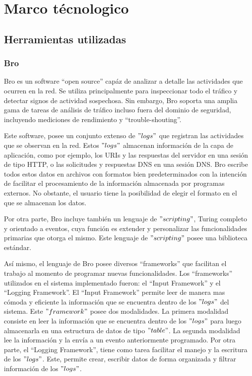 \chapter{Marco técnologico}
\label{capituloTecnologico}

\section{Herramientas utilizadas}

\subsection{Bro}

Bro es un software ``open source'' cap\'az de analizar a detalle las actividades que ocurren en la red. Se utiliza principalmente para inspeccionar todo el tráfico y detectar signos de actividad sospechosa. Sin embargo, Bro soporta una amplia gama de tareas de análisis de tráfico incluso fuera del dominio de seguridad, incluyendo mediciones de rendimiento y ``trouble-shouting''.\cite{Bro}

Este software, posee un conjunto extenso de $"logs"$ que registran las actividades que se observan en la red. Estos $"logs"$ almacenan información de la capa de aplicación, como por ejemplo, los URIs y las respuestas del servidor en una sesión de tipo HTTP, o las solicitudes y respuestas DNS en una sesión DNS. Bro escribe todos estos datos en archivos con formatos bien predeterminados con la intención de facilitar el procesamiento de la información almacenada por programas externos. No obstante, el usuario tiene la posibilidad de elegir el formato en el que se almacenan los datos.

Por otra parte, Bro incluye también un lenguaje de $"scripting"$, Turing completo y orientado a eventos, cuya funci\'on es extender y personalizar las funcionalidades primarias que otorga el mismo. Este lenguaje de $"scripting"$ posee una biblioteca estándar. 

Así mismo, el lenguaje de Bro posee diversos ``frameworks'' que facilitan el trabajo al momento de programar nuevas funcionalidades. Los ``frameworks'' utilizados en el sistema implementado fueron: el ``Input Framework'' y el ``Logging Framework''.
El ``Input Framework'' permite leer de manera mas cómoda y eficiente la información que se encuentra dentro de los $"logs"$ del sistema.
Este $"framework"$ posee dos modalidades. La primera modalidad consiste en leer la información que se encuentra dentro de los $"logs"$ para luego almacenarla en una estructura de datos de tipo $"table"$. La segunda modalidad lee la información y la envía a un evento anteriormente programado.
Por otra parte, el ``Logging Framework'', tiene como tarea facilitar el manejo y la escritura de los $"logs"$. Este, permite crear, escribir datos de forma organizada y filtrar información de los $"logs"$.

